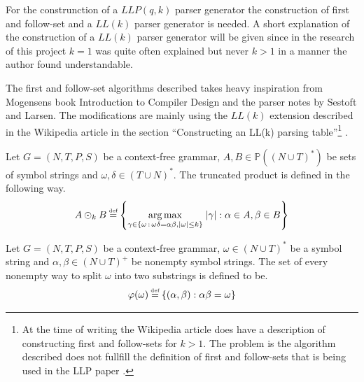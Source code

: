 For the construnction of a $LLP(q,k)$ parser generator the construction of first and follow-set \cite[5]{Vagner2007} and a $LL(k)$ parser generator is needed. A short explanation of the construction of a $LL(k)$ parser generator will be given since in the research of this project $k = 1$ was quite often explained but never $k > 1$ in a manner the author found understandable.

The first and follow-set algorithms described takes heavy inspiration from Mogensens book Introduction to Compiler Design \cite[55-65]{Mogensen} and the parser notes \cite[10-15]{notes:parser} by Sestoft and Larsen. The modifications are mainly using the $LL(k)$ extension described in the Wikipedia article in the section ``Constructing an LL(k) parsing table''\footnote{At the time of writing the Wikipedia article does have a description of constructing first and follow-sets for $k > 1$. The problem is the algorithm described does not fullfill the definition of first and follow-sets that is being used in the LLP paper \cite[5]{Vagner2007}.} \cite{wiki:LL_parser}.

\begin{definition}
    Let $G = (N, T, P, S)$ be a context-free grammar, $A, B \in \mathbb{P}((N \cup T)^*)$ be sets of symbol strings and $\omega, \delta \in (T \cup N)^*$. The truncated product is defined in the following way.
    \begin{gather*}
        A \odot_k B \defeq \left\{\underset{\gamma \in \{\omega \, : \, \omega\delta = \alpha\beta, |\omega| \leq k\}}{\arg \max} \; |\gamma| : \alpha \in A, \beta \in B\right\}
    \end{gather*}
\end{definition}

\begin{definition}
    Let $G = (N, T, P, S)$ be a context-free grammar, $\omega \in (N \cup T)^*$ be a symbol string and $\alpha, \beta \in (N \cup T)^+$ be nonempty symbol strings. The set of every nonempty way to split $\omega$ into two substrings is defined to be.
    \begin{gather*}
        \varphi(\omega) \defeq \{(\alpha, \beta) : \alpha\beta = \omega\}
    \end{gather*}
\end{definition}

